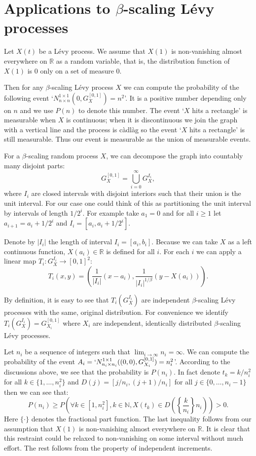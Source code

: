 \documentclass{amsart}
\begin{document}
\section{Applications to  $\beta$-scaling L\'evy processes}\label{LP}

Let $X(t)$ be a L\'evy process. We assume that $X(1)$ is non-vanishing almost everywhere on $\mathbb{R}$ as a random variable, that is, the distribution function of $X(1)$ is 0 only on a set of measure 0. 

Then for any $\beta$-scaling L\'evy process $X$ we can compute the probability of the following event `$N_{n\times n}^{1 \times 1 }(0,G_X^{[0,1]})=n^2$'. It is a positive number depending only on $n$ and we use $P(n)$ to denote this number. The event `$X$ hits a rectangle' is measurable when $X$ is continuous; when it is discontinuous we join the graph with a vertical line and the process is c\`adl\`ag so the event `$X$ hits a rectangle' is still measurable. Thus our event is measurable as the union of measurable events.

For a $\beta$-scaling random process $X$, we can decompose the graph into countably many disjoint parts:
\[
G_X^{[0,1]}=\bigcup_{i=0}^\infty G_X^{I_i},
\]
where $I_i$ are closed intervals with disjoint interiors such that their union is the unit interval. For our case one could think of this as partitioning the unit interval by intervals of length $1/2^i$. For example take $a_1=0$ and for all $i\geq 1$ let $a_{i+1}=a_i+1/2^i$ and $I_i=[a_i,a_i+1/2^{i}].$

Denote by $|I_i|$ the length of interval $I_i=[a_i,b_i]$. Because we can take $X$ as a left continuous function, $X(a_i)\in\mathbb{R}$ is defined for all $i$. For each $i$ we can apply a linear map $T_i: G_X^{I_i} \rightarrow [0,1]^2$:
\[
T_i(x,y)=\left(\frac{1}{|I_i|}(x-a_i),\frac{1}{|I_i|^{1/\beta}}(y-X(a_i))\right).
\]

By definition, it is easy to see that $T_i(G_X^{I_i})$ are independent $\beta$-scaling L\'evy processes with the same, original distribution. For convenience we identify $T_i(G_X^{I_i})=G_{X_i}^{[0,1]}$ where $X_i$  are independent, identically distributed $\beta$-scaling L\'evy processes.

Let $n_i$ be a sequence of integers such that $\lim_{i\to\infty} n_i=\infty$. We can compute the probability of the event $A_i=`N_{n_i\times n_i}^{1 \times 1 }((0,0),G_{X_i}^{[0,1]})=n_i^2 $'. According to the discussions above, we see that the probability is $P(n_i)$. In fact denote $t_k=k/n^2_i$ for all $k\in\{1,\dots,n^2_i\}$ and $D(j)=[j/n_i,(j+1)/n_i]$ for all $j\in\{0,\dots, n_i-1\}$ then we can see that:
\[
P(n_i)\geq P\left(\forall k\in\left[1,n^2_i\right], k\in \mathbb{N},X(t_k)\in D\left(\left\{\frac{k}{n_i}\right\}n_i\right)\right)>0.
\]
Here $\{ \cdot \}$ denotes the fractional part function. The last inequality follows from our assumption that $X(1)$ is non-vanishing almost everywhere on $\mathbb{R}$. It is clear that this restraint could be relaxed to non-vanishing on some interval without much effort. The rest follows from the property of independent increments.
\end{document}
